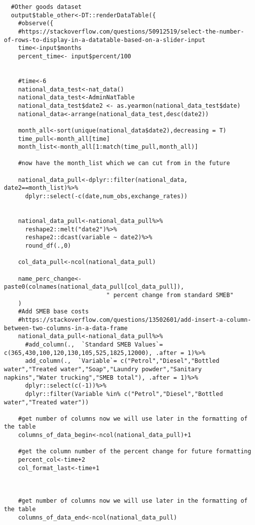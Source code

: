 \documentclass[
]{article}
\begin{document}
\begin{verbatim}
  #Other goods dataset  
  output$table_other<-DT::renderDataTable({
    #observe({
    #https://stackoverflow.com/questions/50912519/select-the-number-of-rows-to-display-in-a-datatable-based-on-a-slider-input
    time<-input$months
    percent_time<- input$percent/100
    
    
    #time<-6
    national_data_test<-nat_data()
    national_data_test<-AdminNatTable
    national_data_test$date2 <- as.yearmon(national_data_test$date)
    national_data<-arrange(national_data_test,desc(date2))
    
    month_all<-sort(unique(national_data$date2),decreasing = T)
    time_pull<-month_all[time]
    month_list<-month_all[1:match(time_pull,month_all)]
    
    #now have the month_list which we can cut from in the future
    
    national_data_pull<-dplyr::filter(national_data, date2==month_list)%>%
      dplyr::select(-c(date,num_obs,exchange_rates))
    
    
    national_data_pull<-national_data_pull%>%
      reshape2::melt("date2")%>%
      reshape2::dcast(variable ~ date2)%>%
      round_df(.,0)
    
    col_data_pull<-ncol(national_data_pull)
    
    name_perc_change<-paste0(colnames(national_data_pull[col_data_pull]),
                             " percent change from standard SMEB"
    )
    #Add SMEB base costs
    #https://stackoverflow.com/questions/13502601/add-insert-a-column-between-two-columns-in-a-data-frame
    national_data_pull<-national_data_pull%>%
      #add_column(.,  `Standard SMEB Values`= c(365,430,100,120,130,105,525,1825,12000), .after = 1)%>%
      add_column(.,  `Variable`= c("Petrol","Diesel","Bottled water","Treated water","Soap","Laundry powder","Sanitary napkins","Water trucking","SMEB total"), .after = 1)%>%
      dplyr::select(c(-1))%>%
      dplyr::filter(Variable %in% c("Petrol","Diesel","Bottled water","Treated water"))
    
    #get number of columns now we will use later in the formatting of the table
    columns_of_data_begin<-ncol(national_data_pull)+1
    
    #get the column number of the percent change for future formatting
    percent_col<-time+2
    col_format_last<-time+1
    
  
   
    #get number of columns now we will use later in the formatting of the table 
    columns_of_data_end<-ncol(national_data_pull)
    

\end{verbatim}
\end{document}
